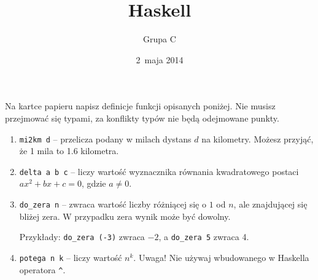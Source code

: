 \documentclass[12pt,a4paper]{article}
\title{Haskell}
\author{Grupa C}
\date{2~maja 2014}
\begin{document}
\maketitle

Na kartce papieru napisz definicje funkcji opisanych poniżej. Nie musisz
przejmować się typami, za konflikty typów nie będą odejmowane punkty.

\begin{enumerate}
  \item {
    \texttt{mi2km d} -- przelicza podany w milach dystans $d$ na kilometry.
    Możesz przyjąć, że 1 mila to 1.6 kilometra.
  }

  \item {
    \texttt{delta a b c} -- liczy wartość wyznacznika równania kwadratowego
    postaci $ax^2+bx+c=0$, gdzie $a \neq 0$.
  }

  \item {
    \texttt{do\_zera n} -- zwraca wartość liczby różniącej się o $1$ od
    $n$, ale znajdującej się bliżej zera. W przypadku zera wynik może być
    dowolny. 
    
    Przykłady: \texttt{do\_zera (-3)} zwraca $-2$, 
    a \texttt{do\_zera 5} zwraca 4.
  }

  \item {
    \texttt{potega n k} -- liczy wartość $n^k$. Uwaga! Nie używaj wbudowanego
    w Haskella operatora \texttt{\^}.
  }
\end{enumerate}
\end{document}
